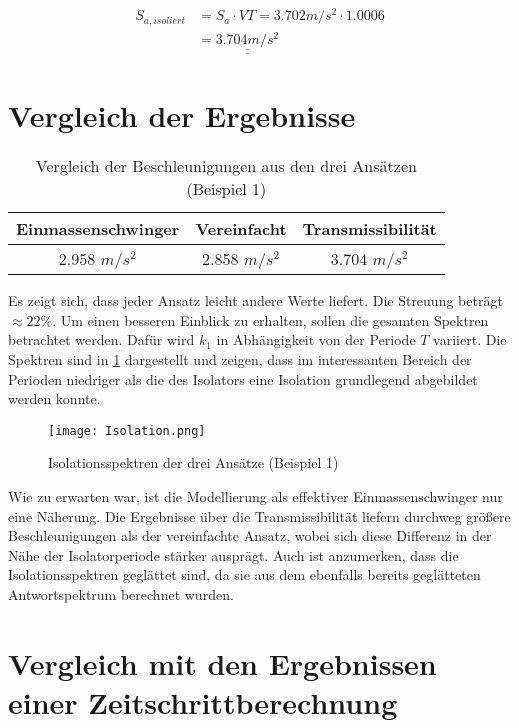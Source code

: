 \begin{align*}
S_{a,isoliert} &= S_a \cdot VT = 3.702 m/s^2 \cdot 1.0006\\
               &= \underline{\underline{3.704 m/s^2}}
\end{align*}

\pagebreak

\section{Vergleich der Ergebnisse}

\begin{table}[H]
\centering
\begin{tabular}{ |c|c|c| } 
 \hline
 Einmassenschwinger & Vereinfacht & Transmissibilität\\
 \hline\hline
 2.958 $m/s^2$ & 2.858 $m/s^2$ & 3.704 $m/s^2$\\
 \hline
\end{tabular}
\caption{Vergleich der Beschleunigungen aus den drei Ansätzen (Beispiel 1)}
\end{table}

Es zeigt sich, dass jeder Ansatz leicht andere Werte liefert. Die Streuung beträgt $\approx 22\%$. 
Um einen besseren Einblick zu erhalten, sollen die gesamten Spektren betrachtet werden. Dafür wird $k_1$ in Abhängigkeit von der Periode $T$ variiert. Die Spektren sind in \cref{fig:Isolation} dargestellt und zeigen, dass im interessanten Bereich der Perioden niedriger als die des Isolators eine Isolation grundlegend abgebildet werden konnte.

\begin{figure}[H]
    \centering
    \texttt{[image: Isolation.png]}
    \caption{Isolationsspektren der drei Ansätze (Beispiel 1)}
    \label{fig:Isolation}
\end{figure}

Wie zu erwarten war, ist die Modellierung als effektiver Einmassenschwinger nur eine Näherung. Die Ergebnisse über die Transmissibilität liefern durchweg größere Beschleunigungen als der vereinfachte Ansatz, wobei sich diese Differenz in der Nähe der Isolatorperiode stärker ausprägt. Auch ist anzumerken, dass die Isolationsspektren geglättet sind, da sie aus dem ebenfalls bereits geglätteten Antwortspektrum berechnet wurden.

\section{Vergleich mit den Ergebnissen einer Zeitschrittberechnung}

